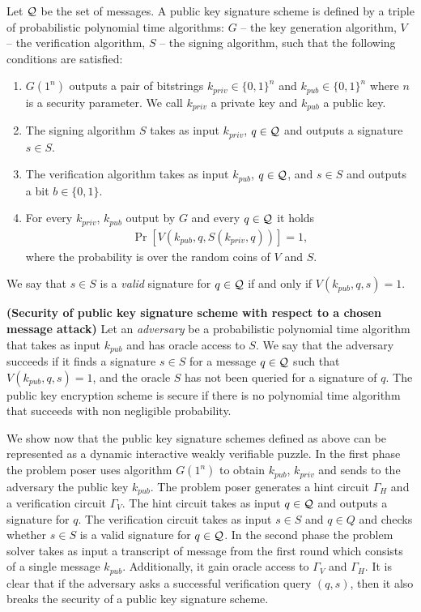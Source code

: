 \documentclass[11pt,a4paper,titlepage]{memoir}
\begin{document}
\begin{definition}
Let $\mathcal{Q}$ be the set of messages. A \textnormal{public key signature scheme} is defined by a triple of probabilistic polynomial time algorithms:
$G$ -- the key generation algorithm,
$V$ -- the verification algorithm,
$S$ -- the signing algorithm,
such that the following conditions are satisfied:
\begin{enumerate}[-]
  \item $G(1^n)$ outputs a pair of bitstrings $k_{priv} \in \{0,1\}^{n}$ and $k_{pub} \in \{0,1\}^{n}$ where $n$ is a security parameter.
    We call $k_{priv}$ a private key and $k_{pub}$ a public key.
  \item The signing algorithm $S$ takes as input $k_{priv}$, $q \in \mathcal{Q}$ and outputs a signature $s \in S$.
  \item The verification algorithm takes as input $k_{pub}$, $q \in \mathcal{Q}$, and $s \in S$ and outputs a bit $b \in \{0,1\}$.
  \item For every $k_{priv}$, $k_{pub}$ output by $G$ and every $q \in \mathcal{Q}$ it holds
    \begin{align*}
      \Pr[V(k_{pub}, q, S(k_{priv}, q))] = 1,
    \end{align*}
    where the probability is over the random coins of $V$ and $S$.
\end{enumerate}
\end{definition}
We say that $s \in S$ is a \textit{valid} signature for $q \in \mathcal{Q}$ if and only if $V(k_{pub}, q, s) = 1$.
%
%
\begin{definition}\textbf{(Security of public key signature scheme with respect to a chosen message attack)}
Let an \textit{adversary} be a probabilistic polynomial time algorithm that takes as input $k_{pub}$ and has oracle access to $S$.
We say that the adversary \textnormal{succeeds} if it finds a signature $s \in S$ for a message $q \in \mathcal{Q}$ such that $V(k_{pub}, q, s) = 1$,
and the oracle $S$ has not been queried for a signature of $q$.
The public key encryption scheme is \textnormal{secure} if there is no polynomial time algorithm that succeeds with non negligible probability.
\end{definition}

We show now that the public key signature schemes defined as above can be represented as a dynamic interactive weakly verifiable puzzle.
In the first phase the problem poser uses algorithm $G(1^n)$ to obtain $k_{pub}$, $k_{priv}$ and sends to the adversary the public key $k_{pub}$.
The problem poser generates a hint circuit $\Gamma_H$ and a verification circuit $\Gamma_V$.
The hint circuit takes as input $q \in \mathcal{Q}$ and outputs a signature for $q$. The verification circuit
takes as input $s \in S$ and $q \in Q$ and checks whether $s \in S$ is a valid signature for $q \in \mathcal{Q}$.
In the second phase the problem solver takes as input a transcript of message from the first round which consists of a single message $k_{pub}$.
Additionally, it gain oracle access to $\Gamma_V$ and $\Gamma_H$.
It is clear that if the adversary asks a successful verification query $(q,s)$, then it also breaks the security of a public key signature scheme.
\end{document}
